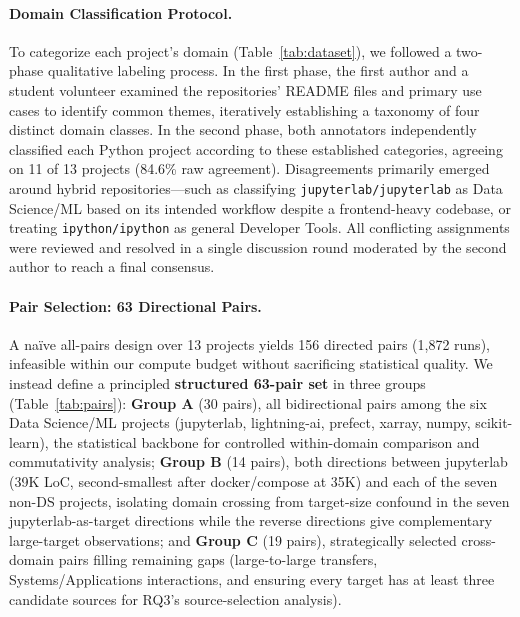 \documentclass[a4paper,fleqn]{cas-dc}
\begin{document}
\paragraph{Domain Classification Protocol.}
To categorize each project's domain (Table~\ref{tab:dataset}), we followed a 
two-phase qualitative labeling process. In the first phase, the first author
 and a student volunteer examined the repositories' README files and 
 primary use cases to identify common themes, iteratively establishing 
 a taxonomy of four distinct domain classes. In the second phase, 
 both annotators independently classified each Python project 
 according to these established categories, agreeing on 11 of 13
 projects (84.6\% raw agreement). Disagreements primarily emerged
 around hybrid repositories—such as classifying 
 \texttt{jupyterlab/jupyterlab} as Data Science/ML 
 based on its intended workflow despite a frontend-heavy codebase, 
 or treating \texttt{ipython/ipython} as general Developer Tools. 
 All conflicting assignments were reviewed and resolved in a 
 single discussion round moderated by the second author to 
 reach a final consensus.

\paragraph{Pair Selection: 63 Directional Pairs.}
 A na\"{i}ve all-pairs design over 13 projects yields 156 directed
pairs (1,872 runs), infeasible within our compute budget without
sacrificing statistical quality. We instead define a principled
\textbf{structured 63-pair set} in three groups (Table~\ref{tab:pairs}):
\textbf{Group A} (30 pairs), all bidirectional pairs among the six Data
Science/ML projects (jupyterlab, lightning-ai, prefect, xarray, numpy,
scikit-learn), the statistical backbone for controlled within-domain
comparison and commutativity analysis; \textbf{Group B} (14 pairs), both
directions between jupyterlab (39K LoC, second-smallest after docker/compose
at 35K) and each of the seven non-DS projects, isolating domain crossing
from target-size confound in the seven jupyterlab-as-target directions while
the reverse directions give complementary large-target observations; and
\textbf{Group C} (19 pairs), strategically selected cross-domain pairs
filling remaining gaps (large-to-large transfers, Systems/Applications
interactions, and ensuring every target has at least three candidate
sources for RQ3's source-selection analysis).
\end{document}
